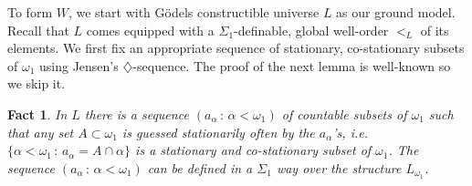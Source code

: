 \documentclass[a4paper,11pt]{article}
\newtheorem{fact}[theorem]{Fact}
\begin{document}
To form $W$, we start with G\"odels constructible universe $L$ as our 
ground model. Recall that $L$ comes equipped with a $\Sigma_1$-definable, global well-order $<_L$ of its elements.
We first fix an appropriate sequence of stationary, co-stationary subsets of $\omega_1$ using Jensen's $\diamondsuit$-sequence. The proof of the next lemma is well-known so we skip it.
\begin{fact}
In $L$ there is a sequence $(a_{\alpha} \, : \, \alpha < \omega_1)$ of countable subsets of $\omega_1$
such that any set $A \subset \omega_1$ is guessed stationarily often by the $a_{\alpha}$'s, i.e.
$\{ \alpha < \omega_1 \, : \, a_{\alpha}= A \cap \alpha \}$ is a stationary and co-stationary subset of $\omega_1$. The sequence $(a_{\alpha} \, : \, \alpha < \omega_1)$ can be defined in a $\Sigma_1$ way over the structure $L_{\omega_1}$.
\end{fact}

 
\end{document}
